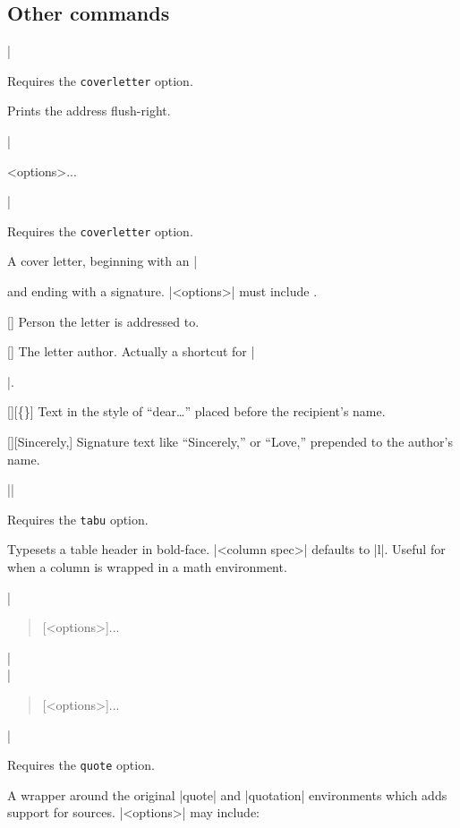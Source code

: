 \documentclass{ltxguidex}
\newcommand{\reqopt}[1]{Requires the \texttt{\color{magenta}#1} option.\par}
\begin{document}
\subsection{Other commands}

\begin{desc}
|\address|
\end{desc}
\reqopt{coverletter} Prints the address flush-right.

\begin{desc}
|\begin{coverletter}{<options>}...\end{coverletter}|
\end{desc}
\reqopt{coverletter} A cover letter, beginning with an |\address| and ending
with a signature. |<options>| must include .
\begin{keys}
	[]
	Person the letter is addressed to.

	[]
	The letter author. Actually a shortcut for |\author{<author>}|.

	[][\{\}]
	Text in the style of ``dear\dots'' placed before the recipient's
	name.

	[][Sincerely,]
	Signature text like ``Sincerely,'' or ``Love,'' prepended to the
	author's name.
\end{keys}

\begin{desc}
||
\end{desc}

\reqopt{tabu} Typesets a table header in bold-face. |<column spec>| defaults
to |l|. Useful for when a column is wrapped in a math environment.

\begin{desc}
|\begin{quote}[<options>]...\end{quote}|\\
|\begin{quotation}[<options>]...\end{quotation}|\\
\end{desc}

\reqopt{quote} A wrapper around the original |quote| and |quotation|
environments which adds support for sources. |<options>| may include:
\end{document}
